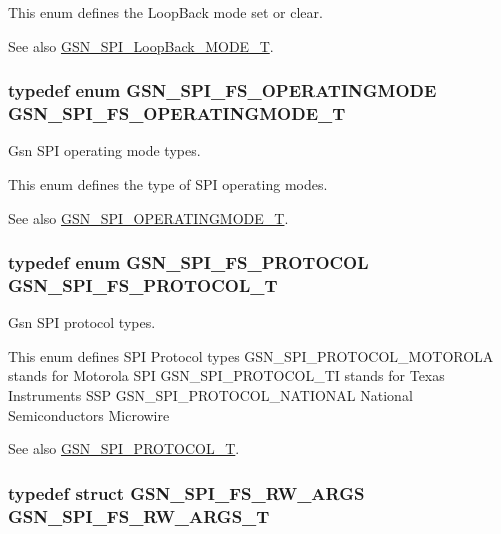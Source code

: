 This enum defines the LoopBack mode set or clear. \begin{DoxySeeAlso}{See also}
\hyperlink{a00655_ga6f83091cbd86860cdb531eb6c520660e}{GSN\_\-SPI\_\-LoopBack\_\-MODE\_\-T}. 
\end{DoxySeeAlso}
\hypertarget{a00655_gab173e44df6afa7f56b96f3a05cb857a5}{
\subsubsection[{GSN\_\-SPI\_\-FS\_\-OPERATINGMODE\_\-T}]{\setlength{\rightskip}{0pt plus 5cm}typedef enum {\bf GSN\_\-SPI\_\-FS\_\-OPERATINGMODE}  {\bf GSN\_\-SPI\_\-FS\_\-OPERATINGMODE\_\-T}}}
\label{a00655_gab173e44df6afa7f56b96f3a05cb857a5}


Gsn SPI operating mode types. 

This enum defines the type of SPI operating modes. \begin{DoxySeeAlso}{See also}
\hyperlink{a00655_ga6621383791d81630bc4c294a7a3d292d}{GSN\_\-SPI\_\-OPERATINGMODE\_\-T}. 
\end{DoxySeeAlso}
\hypertarget{a00655_gaa9b496d91ebb6c1e80cbd1b076c55f40}{
\subsubsection[{GSN\_\-SPI\_\-FS\_\-PROTOCOL\_\-T}]{\setlength{\rightskip}{0pt plus 5cm}typedef enum {\bf GSN\_\-SPI\_\-FS\_\-PROTOCOL}  {\bf GSN\_\-SPI\_\-FS\_\-PROTOCOL\_\-T}}}
\label{a00655_gaa9b496d91ebb6c1e80cbd1b076c55f40}


Gsn SPI protocol types. 

This enum defines SPI Protocol types GSN\_\-SPI\_\-PROTOCOL\_\-MOTOROLA stands for Motorola SPI GSN\_\-SPI\_\-PROTOCOL\_\-TI stands for Texas Instruments SSP GSN\_\-SPI\_\-PROTOCOL\_\-NATIONAL National Semiconductors Microwire \begin{DoxySeeAlso}{See also}
\hyperlink{a00655_gafc404344d5f8c6a8358fa3be07a87444}{GSN\_\-SPI\_\-PROTOCOL\_\-T}. 
\end{DoxySeeAlso}
\hypertarget{a00655_gaafeeec883c4d267e64fb48904915cc43}{
\subsubsection[{GSN\_\-SPI\_\-FS\_\-RW\_\-ARGS\_\-T}]{\setlength{\rightskip}{0pt plus 5cm}typedef struct {\bf GSN\_\-SPI\_\-FS\_\-RW\_\-ARGS}  {\bf GSN\_\-SPI\_\-FS\_\-RW\_\-ARGS\_\-T}}}
\label{a00655_gaafeeec883c4d267e64fb48904915cc43}



